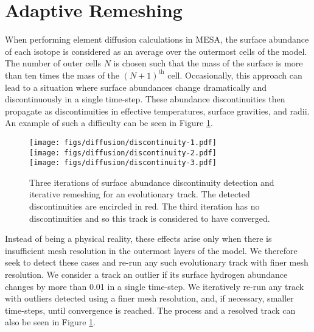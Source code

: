 \documentclass[twocolumn,twocolappendix]{aastex6}
\newcommand{\colwidth}{\linewidth}
\begin{document}
\section{Adaptive Remeshing}
\label{sec:remeshing}

When performing element diffusion calculations in MESA, the surface abundance of each isotope is considered as an average over the outermost cells of the model. The number of outer cells $N$ is chosen such that the mass of the surface is more than ten times the mass of the $(N+1)^{\text{th}}$ cell. Occasionally, this approach can lead to a situation where surface abundances change dramatically and discontinuously in a single time-step. These abundance discontinuities then propagate as discontinuities in effective temperatures, surface gravities, and radii. An example of such a difficulty can be seen in Figure \ref{fig:discontinuity}. 

\begin{figure}
    \centering
    \texttt{[image: figs/diffusion/discontinuity-1.pdf]}\\
    \texttt{[image: figs/diffusion/discontinuity-2.pdf]}\\
    \texttt{[image: figs/diffusion/discontinuity-3.pdf]}\\
    \caption{Three iterations of surface abundance discontinuity detection and iterative remeshing for an evolutionary track. The detected discontinuities are encircled in red. The third iteration has no discontinuities and so this track is considered to have converged. }
    \label{fig:discontinuity}
\end{figure}

Instead of being a physical reality, these effects arise only when there is insufficient mesh resolution in the outermost layers of the model. We therefore seek to detect these cases and re-run any such evolutionary track with finer mesh resolution. We consider a track an outlier if its surface hydrogen abundance changes by more than 0.01 in a single time-step. We iteratively re-run any track with outliers detected using a finer mesh resolution, and, if necessary, smaller time-steps, until convergence is reached. The process and a resolved track can also be seen in Figure \ref{fig:discontinuity}. 
\end{document}
